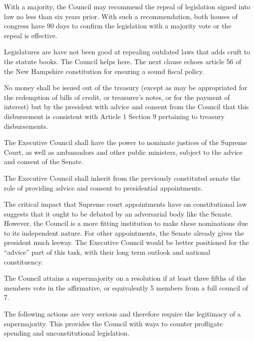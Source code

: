 \documentclass{article}
\newcommand{\quotes}[1]{``#1''}
\begin{document}
\begin{quoting}
With a majority, the Council may recommend the repeal of legislation signed into law no less than six years prior. With such a recommendation, both houses of congress have 90 days to confirm the legislation with a majority vote or the repeal is effective.
\end{quoting}

Legislatures are have not been good at repealing outdated laws that adds cruft to the statute books. The Council helps here. The next clause echoes article 56 of the New Hampshire constitution\cite{New Hampshire Constitution} for ensuring a sound fiscal policy.

\begin{quoting}
No money shall be issued out of the treasury (except as may be appropriated for the redemption of bills of credit, or treasurer's notes, or for the payment of interest) but by the president with advice and consent from the Council that this disbursement is consistent with Article 1 Section 9 pertaining to treasury disbursements.

The Executive Council shall have the power to nominate justices of the Supreme Court, as well as ambassadors and other public ministers, subject to the advice and consent of the Senate.

The Executive Council shall inherit from the previously constituted senate the role of providing advice and consent to presidential appointments.
\end{quoting}

The critical impact that Supreme court appointments have on constitutional law suggests that it ought to be debated by an adversarial body like the Senate. However, the Council is a more fitting institution to make these nominations due to its independent nature. For other appointments, the Senate already gives the president much leeway. The Executive Council would be better positioned for the \quotes{advice} part of this task, with their long term outlook and national constituency.

\begin{quoting}
The Council attains a supermajority on a resolution if at least three fifths of the members vote in the affirmative, or equivalently 5 members from a full council of 7.
\end{quoting}

The following actions are very serious and therefore require the legitimacy of a supermajority. This provides the Council with ways to counter profligate spending and unconstitutional legislation.
\end{document}
